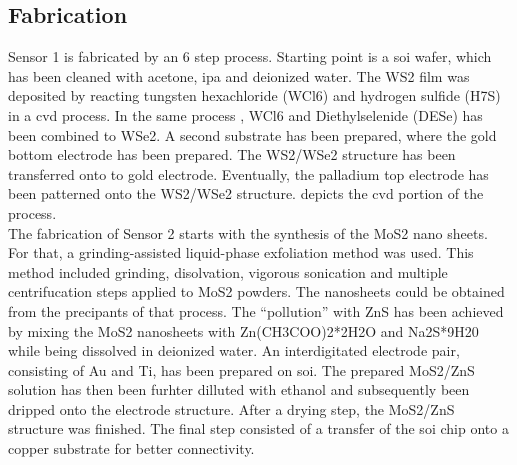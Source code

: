 \subsection{Fabrication}
Sensor 1 is fabricated by an 6 step process. Starting point is a \Gls{soi} wafer, which has been cleaned with acetone, \gls{ipa} and deionized water.  The WS2 film was deposited by reacting tungsten hexachloride (WCl6) and hydrogen sulfide (H7S) in a \gls{cvd} process. In the same process , WCl6 and Diethylselenide (DESe) has been combined to WSe2. A second substrate has been prepared, where the gold bottom electrode has been prepared. The WS2/WSe2 structure has been transferred onto to gold electrode. Eventually, the palladium top electrode has been patterned onto the WS2/WSe2 structure.  depicts the \gls{cvd} portion of the process.\\
The fabrication of Sensor 2 starts with the synthesis of the MoS2 nano sheets. For that, a grinding-assisted liquid-phase exfoliation method was used. This method included grinding, disolvation, vigorous sonication and multiple centrifucation steps applied to MoS2 powders. The nanosheets could be obtained from the precipants of that process. The \enquote{pollution} with ZnS has been achieved by mixing the MoS2 nanosheets with Zn(CH3COO)2*2H2O and Na2S*9H20 while being dissolved in deionized water. An interdigitated electrode pair, consisting of Au and Ti, has been prepared on \gls{soi}. The prepared MoS2/ZnS solution has then been furhter dilluted with ethanol and subsequently been dripped onto the electrode structure. After a drying step, the MoS2/ZnS structure was finished. The final step consisted of a transfer of the \gls{soi} chip onto a copper substrate for better connectivity.
